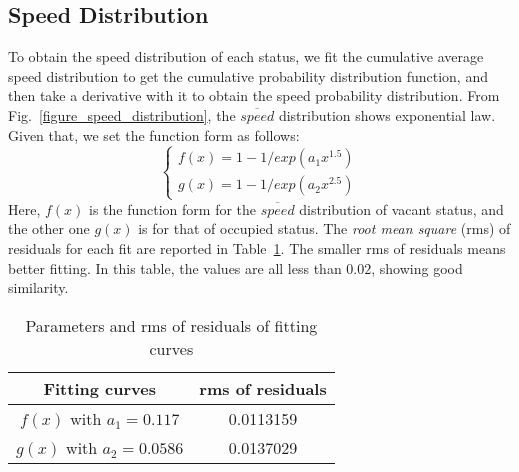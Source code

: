 \subsection{Speed Distribution}
\label{section_speed_modeling}
To obtain the speed distribution of each status, we fit the cumulative average speed distribution to get the cumulative probability distribution function, and then take a derivative with it to obtain the speed probability distribution. From Fig.~\ref{figure_speed_distribution}, the $\overline{speed}$ distribution shows exponential law. Given that, we set the function form as follows:
\begin{equation}\label{formular_ccdf_speed}
\left\{
\begin{array}{ll}
f(x) = 1-1/exp(a_1x^{1.5})\\
g(x) = 1-1/exp(a_2x^{2.5})
\end{array}
\right.
\end{equation}
Here, $f(x)$ is the function form for the $\overline{speed}$ distribution of vacant status, and the other one $g(x)$ is for that of occupied status. The \emph{root mean square} (rms) of residuals for each fit are reported in Table~\ref{table_rms}. The smaller rms of residuals means better fitting. In this table, the values are all less than $0.02$, showing good similarity.

\begin{table}[!t]
\caption{Parameters and rms of residuals of fitting curves}\label{table_rms}
\centering
\begin{tabular}{c|c}
  \hline
  Fitting curves & rms of residuals  \\
  \hline
  $f(x)$ with $a_1=0.117$ &0.0113159\\
  \hline
  $g(x)$ with $a_2=0.0586$ &0.0137029\\
  \hline
\end{tabular}
\end{table}




